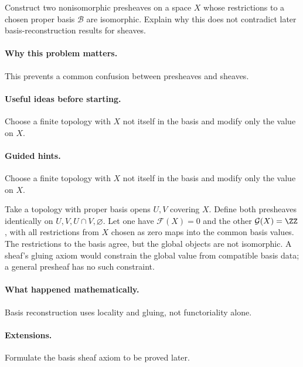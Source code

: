 \begin{problem}
Construct two nonisomorphic presheaves on a space $X$ whose restrictions to a chosen proper basis $\mathcal B$ are isomorphic.  Explain why this does not contradict later basis-reconstruction results for sheaves.
\end{problem}

\paragraph{Why this problem matters.}
This prevents a common confusion between presheaves and sheaves.

\paragraph{Useful ideas before starting.}
Choose a finite topology with $X$ not itself in the basis and modify only the value on $X$.

\paragraph{Guided hints.}
Choose a finite topology with $X$ not itself in the basis and modify only the value on $X$.

\begin{solution}
Take a topology with proper basis opens $U,V$ covering $X$.  Define both presheaves identically on $U,V,U\cap V,\varnothing$.  Let one have $\mathcal F(X)=0$ and the other $\mathcal G(X)=\ZZ$, with all restrictions from $X$ chosen as zero maps into the common basis values.  The restrictions to the basis agree, but the global objects are not isomorphic.  A sheaf's gluing axiom would constrain the global value from compatible basis data; a general presheaf has no such constraint.
\end{solution}

\paragraph{What happened mathematically.}
Basis reconstruction uses locality and gluing, not functoriality alone.

\paragraph{Extensions.}
Formulate the basis sheaf axiom to be proved later.
